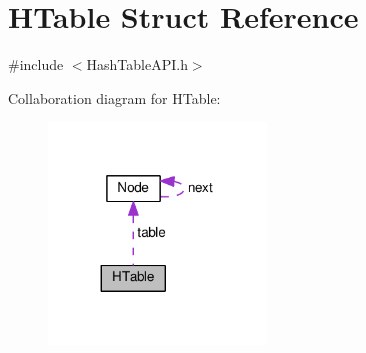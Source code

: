 \hypertarget{structHTable}{}\section{H\+Table Struct Reference}
\label{structHTable}


{\ttfamily \#include $<$Hash\+Table\+A\+P\+I.\+h$>$}



Collaboration diagram for H\+Table\+:\nopagebreak
\begin{figure}[H]
\begin{center}
\leavevmode
\includegraphics[width=164pt]{structHTable__coll__graph}
\end{center}
\end{figure}
